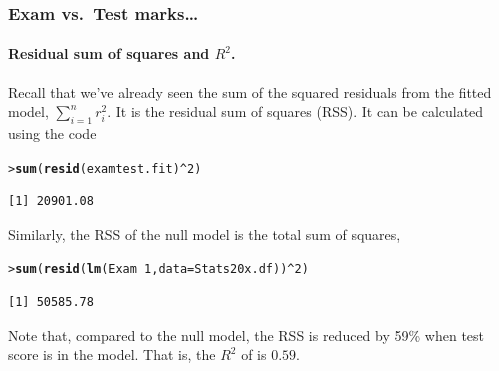 \documentclass{beamer}\usepackage[]{graphicx}\usepackage[]{xcolor}
\makeatletter
\newcommand{\hlnum}[1]{\textcolor[rgb]{0.686,0.059,0.569}{#1}}%
\newcommand{\hlopt}[1]{\textcolor[rgb]{0,0,0}{#1}}%
\newcommand{\hlstd}[1]{\textcolor[rgb]{0.345,0.345,0.345}{#1}}%
\newcommand{\hlkwc}[1]{\textcolor[rgb]{0.333,0.667,0.333}{#1}}%
\newcommand{\hlkwd}[1]{\textcolor[rgb]{0.737,0.353,0.396}{\textbf{#1}}}%
\newenvironment{kframe}{%
 \def\at@end@of@kframe{}%
 \ifinner\ifhmode%
  \def\at@end@of@kframe{\end{minipage}}%
  \begin{minipage}{\columnwidth}%
 \fi\fi%
 \def\FrameCommand##1{\hskip\@totalleftmargin \hskip-\fboxsep
 \colorbox{shadecolor}{##1}\hskip-\fboxsep
     \hskip-\linewidth \hskip-\@totalleftmargin \hskip\columnwidth}%
 \MakeFramed {\advance\hsize-\width
   \@totalleftmargin\z@ \linewidth\hsize
   \@setminipage}}%
 {\par\unskip\endMakeFramed%
 \at@end@of@kframe}
\newenvironment{knitrout}{}{} %
\makeatother
\begin{document}
\begin{frame}[fragile]
\frametitle{Exam vs.\ Test marks\ldots}
\framesubtitle{Residual sum of squares and $R^2$.}
Recall that we've already seen the sum of the squared residuals from the fitted model,
$\sum_{i=1}^{n}r_{i}^2$. It is the residual sum of squares (RSS). 
It can be calculated using the  code

\begin{knitrout}\scriptsize
{}\color{fgcolor}\begin{kframe}
\begin{alltt}
\hlstd{> }\hlkwd{sum}\hlstd{(}\hlkwd{resid}\hlstd{(examtest.fit)}\hlopt{^}\hlnum{2}\hlstd{)}
\end{alltt}
\begin{verbatim}
[1] 20901.08
\end{verbatim}
\end{kframe}
\end{knitrout}
\medskip

Similarly, the RSS of the null model is the total sum of squares,
\begin{knitrout}\scriptsize
{}\color{fgcolor}\begin{kframe}
\begin{alltt}
\hlstd{> }\hlkwd{sum}\hlstd{(}\hlkwd{resid}\hlstd{(}\hlkwd{lm}\hlstd{(Exam}\hlopt{~}\hlnum{1}\hlstd{,}\hlkwc{data}\hlstd{=Stats20x.df))}\hlopt{^}\hlnum{2}\hlstd{)}
\end{alltt}
\begin{verbatim}
[1] 50585.78
\end{verbatim}
\end{kframe}
\end{knitrout}
\medskip

Note that, compared to the null model, 
the RSS is reduced by 59\% when test score is in the model.
That is, the $R^2$ of  is $0.59$.
\end{frame}



\end{document}
